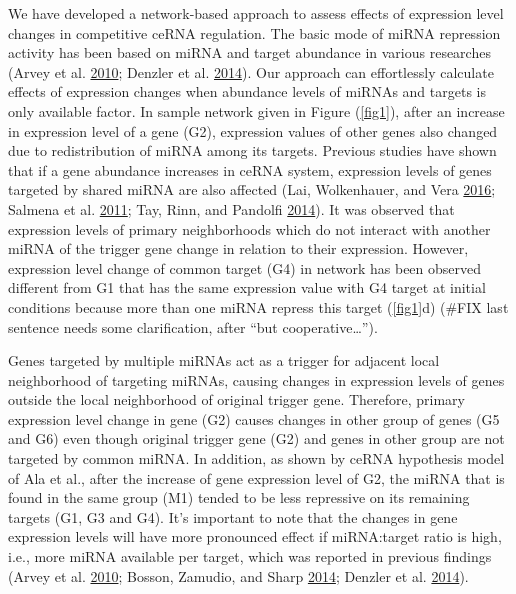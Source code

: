 \documentclass[a4,center,fleqn]{NAR}
\begin{document}
We have developed a network-based approach to assess effects of
expression level changes in competitive ceRNA regulation. The basic mode
of miRNA repression activity has been based on miRNA and target
abundance in various researches (Arvey et al.
\protect\hyperlink{ref-arvey_target_2010}{2010}; Denzler et al.
\protect\hyperlink{ref-denzler_assessing_2014}{2014}). Our approach can
effortlessly calculate effects of expression changes when abundance
levels of miRNAs and targets is only available factor. In sample network
given in Figure (\autoref{fig1}), after an increase in expression level
of a gene (G2), expression values of other genes also changed due to
redistribution of miRNA among its targets. Previous studies have shown
that if a gene abundance increases in ceRNA system, expression levels of
genes targeted by shared miRNA are also affected (Lai, Wolkenhauer, and
Vera \protect\hyperlink{ref-lai_understanding_2016}{2016}; Salmena et
al. \protect\hyperlink{ref-salmena_cerna_2011}{2011}; Tay, Rinn, and
Pandolfi \protect\hyperlink{ref-tay_multilayered_2014}{2014}). It was
observed that expression levels of primary neighborhoods which do not
interact with another miRNA of the trigger gene change in relation to
their expression. However, expression level change of common target (G4)
in network has been observed different from G1 that has the same
expression value with G4 target at initial conditions because more than
one miRNA repress this target (\autoref{fig1}d) (\#FIX last sentence
needs some clarification, after ``but cooperative\ldots{}'').

Genes targeted by multiple miRNAs act as a trigger for adjacent local
neighborhood of targeting miRNAs, causing changes in expression levels
of genes outside the local neighborhood of original trigger gene.
Therefore, primary expression level change in gene (G2) causes changes
in other group of genes (G5 and G6) even though original trigger gene
(G2) and genes in other group are not targeted by common miRNA. In
addition, as shown by ceRNA hypothesis model of Ala et al., after the
increase of gene expression level of G2, the miRNA that is found in the
same group (M1) tended to be less repressive on its remaining targets
(G1, G3 and G4). It's important to note that the changes in gene
expression levels will have more pronounced effect if miRNA:target ratio
is high, i.e., more miRNA available per target, which was reported in
previous findings (Arvey et al.
\protect\hyperlink{ref-arvey_target_2010}{2010}; Bosson, Zamudio, and
Sharp \protect\hyperlink{ref-bosson_endogenous_2014}{2014}; Denzler et
al. \protect\hyperlink{ref-denzler_assessing_2014}{2014}). \href{}{}
\end{document}
